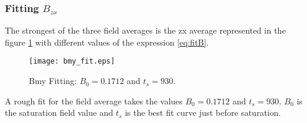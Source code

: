 \subsubsection{Fitting $B_{zx}$}
The strongest of the three field averages is the zx average represented in the figure \ref{fig:bmy_fit} with different values of the expression \ref{eq:fitB}.
\begin{figure}[h]
\centering
\texttt{[image: bmy\_fit.eps]}
\caption{Bmy Fitting: $B_0=0.1712$ and $t_s = 930$.}
\label{fig:bmy_fit}
 \end{figure}
A rough fit for the field average takes the values $B_0=0.1712$ and $t_s = 930$.
$B_0$ is the saturation field value and $t_s$ is the best fit curve just before saturation.

